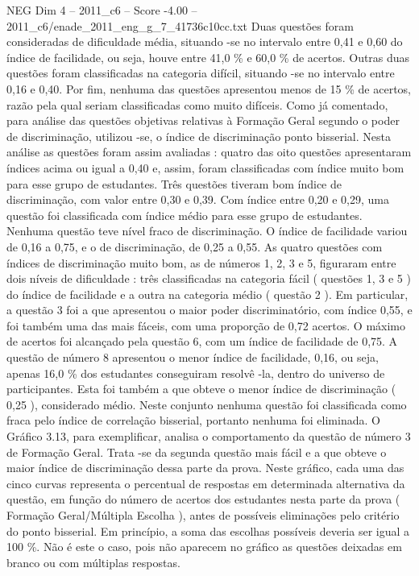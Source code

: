 \begin{textsample}{NEG Dim 4 – 2011\_c6 – Score -4.00 – 2011\_c6/enade\_2011\_eng\_g\_7\_41736c10cc.txt}
Duas questões foram consideradas de dificuldade média, situando -se no intervalo entre 0,41 e 0,60 do índice de facilidade, ou seja, houve entre 41,0 \% e 60,0 \% de acertos.
Outras duas questões foram classificadas na categoria difícil, situando -se no intervalo entre 0,16 e 0,40.
Por fim, nenhuma das questões apresentou menos de 15 \% de acertos, razão pela qual seriam classificadas como muito difíceis.
Como já comentado, para análise das questões objetivas relativas à Formação Geral segundo o poder de discriminação, utilizou -se, o índice de discriminação ponto bisserial.
Nesta análise as questões foram assim avaliadas : quatro das oito questões apresentaram índices acima ou igual a 0,40 e, assim, foram classificadas com índice muito bom para esse grupo de estudantes.
Três questões tiveram bom índice de discriminação, com valor entre 0,30 e 0,39.
Com índice entre 0,20 e 0,29, uma questão foi classificada com índice médio para esse grupo de estudantes.
Nenhuma questão teve nível fraco de discriminação.
O índice de facilidade variou de 0,16 a 0,75, e o de discriminação, de 0,25 a 0,55.
As quatro questões com índices de discriminação muito bom, as de números 1, 2, 3 e 5, figuraram entre dois níveis de dificuldade : três classificadas na categoria fácil ( questões 1, 3 e 5 ) do índice de facilidade e a outra na categoria médio ( questão 2 ).
Em particular, a questão 3 foi a que apresentou o maior poder discriminatório, com índice 0,55, e foi também uma das mais fáceis, com uma proporção de 0,72 acertos.
O máximo de acertos foi alcançado pela questão 6, com um índice de facilidade de 0,75.
A questão de número 8 apresentou o menor índice de facilidade, 0,16, ou seja, apenas 16,0 \% dos estudantes conseguiram resolvê -la, dentro do universo de participantes.
Esta foi também a que obteve o menor índice de discriminação ( 0,25 ), considerado médio.
Neste conjunto nenhuma questão foi classificada como fraca pelo índice de correlação bisserial, portanto nenhuma foi eliminada.
O Gráfico 3.13, para exemplificar, analisa o comportamento da questão de número 3 de Formação Geral.
Trata -se da segunda questão mais fácil e a que obteve o maior índice de discriminação dessa parte da prova.
Neste gráfico, cada uma das cinco curvas representa o percentual de respostas em determinada alternativa da questão, em função do número de acertos dos estudantes nesta parte da prova ( Formação Geral/Múltipla Escolha ), antes de possíveis eliminações pelo critério do ponto bisserial.
Em princípio, a soma das escolhas possíveis deveria ser igual a 100 \%.
Não é este o caso, pois não aparecem no gráfico as questões deixadas em branco ou com múltiplas respostas.

\end{textsample}
